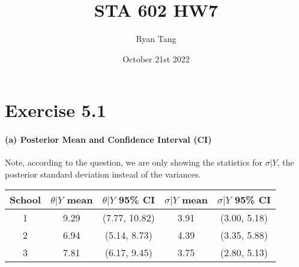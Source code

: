 \documentclass[11pt, letterpaper]{article}
\author{Ryan Tang}
\title{STA 602 HW7}
\date{October 21st 2022}
\begin{document}
\maketitle

\section{Exercise 5.1}
\paragraph{(a) Posterior Mean and Confidence Interval (CI)}
Note, according to the question, we are only showing the statistics for $\sigma|Y$, the posterior standard deviation instead of the variances.
\begin{center}
\begin{tabular}{||c c c c c||} 
 \hline
 School & $\theta|Y$ mean & $\theta|Y$ 95\% CI & $\sigma|Y$ mean & $\sigma|Y$ 95\% CI \\ [0.5ex] 
 \hline\hline
 1 & 9.29 & (7.77, 10.82) & 3.91 & (3.00, 5.18) \\ 
 \hline
 2 & 6.94 & (5.14, 8.73) & 4.39 &(3.35, 5.88) \\
 \hline
 3 & 7.81 & (6.17, 9.45) & 3.75 & (2.80, 5.13) \\
 \hline
\end{tabular}
\end{center}
\end{document}
